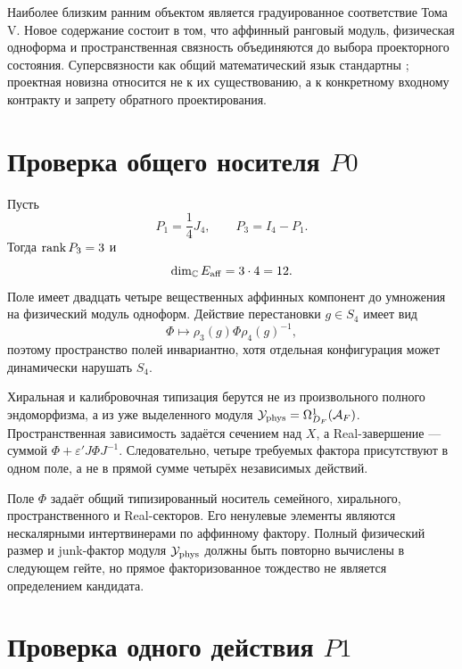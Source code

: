 Наиболее близким ранним объектом является градуированное соответствие Тома V.
Новое содержание состоит в том, что аффинный ранговый модуль, физическая
одноформа и пространственная связность объединяются до выбора проекторного
состояния. Суперсвязности как общий математический язык стандартны
\cite{v7-quillen1985}; проектная новизна относится не к их существованию, а к
конкретному входному контракту и запрету обратного проектирования.

\section{Проверка общего носителя \texorpdfstring{$P0$}{P0}}

Пусть
\begin{equation}
 P_1=\frac14J_4,
 \qquad
 P_3=I_4-P_1.
\end{equation}
Тогда $\operatorname{rank} P_3=3$ и
\begin{equation}
 \dim_{\mathbb C}E_{\rm aff}=3\cdot4=12.
\end{equation}
Поле имеет двадцать четыре вещественных аффинных компонент до умножения на
физический модуль одноформ. Действие перестановки $g\in S_4$ имеет вид
\begin{equation}
 \Phi\longmapsto
 \rho_3(g)\Phi\rho_4(g)^{-1},
\end{equation}
поэтому пространство полей инвариантно, хотя отдельная конфигурация может
динамически нарушать $S_4$.

Хиральная и калибровочная типизация берутся не из произвольного полного
эндоморфизма, а из уже выделенного модуля
$\mathcal Y_{\rm phys}=\Omega^1_{D_F}(\mathcal A_F)$. Пространственная
зависимость задаётся сечением над $X$, а Real-завершение --- суммой
$\Phi+\varepsilon'J\Phi J^{-1}$. Следовательно, четыре требуемых фактора
присутствуют в одном поле, а не в прямой сумме четырёх независимых действий.

\begin{proposition}
Поле $\Phi$ задаёт общий типизированный носитель семейного, хирального,
пространственного и Real-секторов. Его ненулевые элементы являются
нескалярными интертвинерами по аффинному фактору. Полный физический размер и
junk-фактор модуля $\mathcal Y_{\rm phys}$ должны быть повторно вычислены в
следующем гейте, но прямое факторизованное тождество не является определением
кандидата.
\end{proposition}

\section{Проверка одного действия \texorpdfstring{$P1$}{P1}}

